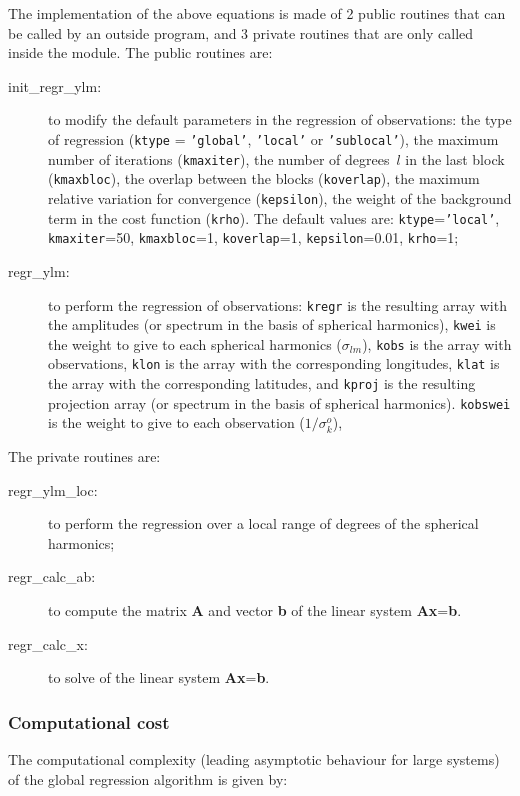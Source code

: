 \documentclass[11pt]{article}
\begin{document}
The implementation of the above equations
is made of 2 public routines that can be called
by an outside program, and 3 private routines that are only called
inside the module.
The public routines are:
\begin{description}
\item[init\_regr\_ylm:] to modify the default parameters
  in the regression of observations:
  the type of regression ({\tt ktype} = {\tt 'global'}, {\tt 'local'} or {\tt 'sublocal'}),
  the maximum number of iterations ({\tt kmaxiter}),
  the number of degrees~$l$ in the last block ({\tt kmaxbloc}),
  the overlap between the blocks ({\tt koverlap}),
  the maximum relative variation for convergence ({\tt kepsilon}),
  the weight of the background term in the cost function ({\tt krho}).
  The default values are: {\tt ktype}={\tt 'local'}, {\tt kmaxiter}=50,
  {\tt kmaxbloc}=1, {\tt koverlap}=1, {\tt kepsilon}=0.01, {\tt krho}=1;
\item[regr\_ylm:] to perform the regression of observations:
  {\tt kregr} is the resulting array with the amplitudes
              (or spectrum in the basis of spherical harmonics),
  {\tt kwei} is the weight to give to each spherical harmonics ($\sigma_{lm}$),
  {\tt kobs} is the array with observations,
  {\tt klon} is the array with the corresponding longitudes,
  {\tt klat} is the array with the corresponding latitudes, and
  {\tt kproj} is the resulting projection array (or spectrum
              in the basis of spherical harmonics).
  {\tt kobswei} is the weight to give to each observation ($1/\sigma_k^o$),
\end{description}
The private routines are:
\begin{description}
\item[regr\_ylm\_loc:] to perform the regression 
            over a local range of degrees of the spherical harmonics;
\item[regr\_calc\_ab:] to compute the matrix {\bf A} and vector {\bf b}
            of the linear system {\bf A}{\bf x}={\bf b}.
\item[regr\_calc\_x:] to solve of the linear system {\bf A}{\bf x}={\bf b}.
\end{description}

\subsubsection*{Computational cost}

The computational complexity (leading asymptotic behaviour for large systems)
of the global regression algorithm is given by:
\end{document}
